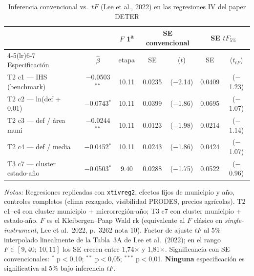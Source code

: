 \begin{table}[!htbp]
  \centering
  \footnotesize
  \caption{Inferencia convencional vs.\ $tF$ (Lee et al., 2022) en las regresiones IV del paper DETER}
  \label{tab:tF_inference}
  \begin{tabular}{lcccccc}
    \toprule
                   &              & $F$ 1\textsuperscript{a} & \multicolumn{2}{c}{SE convencional} & \multicolumn{2}{c}{SE $tF_{5\%}$} \\
    \cmidrule(lr){4-5}\cmidrule(lr){6-7}
    Especificación & $\hat\beta$  & etapa                    & SE      & ($t$)            & SE      & ($t_{tF}$) \\
    \midrule
    T2 c1 — IHS (benchmark) & $-$0.0503$^{**}$ & 10.11 & 0.0235 & ($-$2.14) & 0.0409 & ($-$1.23) \\
    T2 c2 — ln(def + 0{,}01) & $-$0.0743$^{*}$ & 10.11 & 0.0399 & ($-$1.86) & 0.0695 & ($-$1.07) \\
    T2 c3 — def / área muni & $-$0.0244$^{**}$ & 10.11 & 0.0123 & ($-$1.98) & 0.0214 & ($-$1.14) \\
    T2 c4 — def / media & $-$0.0452$^{*}$ & 10.11 & 0.0243 & ($-$1.86) & 0.0424 & ($-$1.07) \\
    T3 c7 — cluster estado-año & $-$0.0503$^{*}$ & 9.40 & 0.0288 & ($-$1.75) & 0.0522 & ($-$0.96) \\
    \bottomrule
  \end{tabular}
  \begin{minipage}{0.95\linewidth}
    \vspace{4pt}\scriptsize
    \textit{Notas:} Regresiones replicadas con \texttt{xtivreg2}, efectos fijos de
    municipio y año, controles completos (clima rezagado, visibilidad PRODES, precios
    agrícolas). T2 c1--c4 con cluster municipio + microrregión-año; T3 c7 con cluster
    municipio + estado-año. $F$ es el Kleibergen--Paap Wald rk (equivalente al $F$
    clásico en \textit{single-instrument}, Lee et al.\ 2022, p.~3262 nota 10). Factor de
    ajuste $tF$ al 5\% interpolado linealmente de la Tabla~3A de Lee et al.\ (2022); en el
    rango $F \in [9{,}40;\ 10{,}11]$ los SE crecen entre 1{,}74$\times$ y 1{,}81$\times$.
    Significancia con SE convencionales: $^*$ p$<$0{,}10; $^{**}$ p$<$0{,}05; $^{***}$ p$<$0{,}01.
    \textbf{Ninguna} especificación es significativa al 5\% bajo inferencia $tF$.
  \end{minipage}
\end{table}

